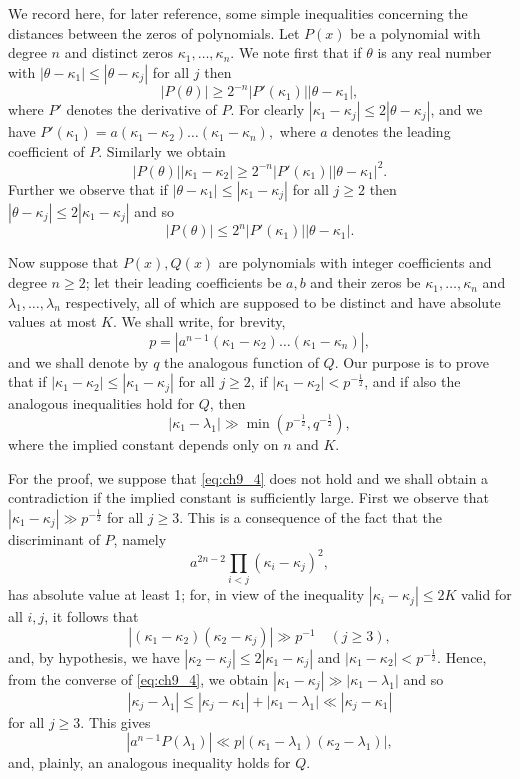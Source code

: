 We record here, for later reference, some simple inequalities concerning the distances between the zeros of polynomials. Let $P(x)$ be a polynomial with degree $n$ and distinct zeros $\kappa_1, \ldots, \kappa_n$. We note first that if $\theta$ is any real number with $|\theta - \kappa_1| \leq |\theta - \kappa_j|$ for all $j$ then
\[|P(\theta)| \geqslant 2^{-n} |P'(\kappa_1)| |\theta - \kappa_1|, \tag{1}\label{eq:ch9_1}\]
where $P'$ denotes the derivative of $P$. For clearly $|\kappa_1 - \kappa_j| \leq 2 |\theta - \kappa_j|$, and we have $P'(\kappa_1) = a(\kappa_1 - \kappa_2) \dots (\kappa_1 - \kappa_n),$ where $a$ denotes the leading coefficient of $P$. Similarly we obtain
\[|P(\theta)| |\kappa_1 - \kappa_2| \ge 2^{-n} |P'(\kappa_1)| |\theta - \kappa_1|^2. \tag{2}\label{eq:ch9_2}\]
Further we observe that if $|\theta - \kappa_1| \leq |\kappa_1 - \kappa_j|$ for all $j \geq 2$ then $|\theta - \kappa_j| \leq 2|\kappa_1 - \kappa_j|$ and so
\[|P(\theta)| \leq 2^n |P'(\kappa_1)| |\theta - \kappa_1|. \tag{3}\label{eq:ch9_3}\]

Now suppose that $P(x), Q(x)$ are polynomials with integer coefficients and degree $n \ge 2$; let their leading coefficients be $a, b$ and their zeros be $\kappa_1, \ldots, \kappa_n$ and $\lambda_1, \ldots, \lambda_n$ respectively, all of which are supposed to be distinct and have absolute values at most $K$. We shall write, for brevity,
\[p = |a^{n-1}(\kappa_1 - \kappa_2) \dots (\kappa_1 - \kappa_n)|,\]
and we shall denote by $q$ the analogous function of $Q$. Our purpose is to prove that if $|\kappa_1 - \kappa_2| \leq |\kappa_1 - \kappa_j|$ for all $j \geq 2$, if $|\kappa_1 - \kappa_2| < p^{-\frac{1}{2}}$, and if also the analogous inequalities hold for $Q$, then
\[|\kappa_1 - \lambda_1| \gg \min(p^{-\frac{1}{2}}, q^{-\frac{1}{2}}), \tag{4}\label{eq:ch9_4}\]
where the implied constant depends only on $n$ and $K$.

For the proof, we suppose that \eqref{eq:ch9_4} does not hold and we shall obtain a contradiction if the implied constant is sufficiently large. First we observe that $|\kappa_1 - \kappa_j| \gg p^{-\frac{1}{2}}$ for all $j \geqslant 3$. This is a consequence of the fact that the discriminant of $P$, namely
\[a^{2n-2}\prod_{i< j}(\kappa_i-\kappa_j)^2,\]
has absolute value at least 1; for, in view of the inequality $|\kappa_i - \kappa_j| \le 2K$ valid for all $i, j$, it follows that
\[\left|(\kappa_1-\kappa_2)(\kappa_2-\kappa_j)\right|\gg p^{-1}\quad (j\geqslant 3),\]
and, by hypothesis, we have $|\kappa_2 - \kappa_j| \leq 2 |\kappa_1 - \kappa_j|$ and $|\kappa_1 - \kappa_2| < p^{-\frac{1}{2}}$.
Hence, from the converse of \eqref{eq:ch9_4}, we obtain $|\kappa_1 - \kappa_j| \gg |\kappa_1 - \lambda_1|$ and so
\[|\kappa_j - \lambda_1| \leq |\kappa_j - \kappa_1| + |\kappa_1 - \lambda_1| \ll |\kappa_j - \kappa_1|\]
for all $j \ge 3$. This gives
\[\left|a^{n-1}P(\lambda_1)\right| \ll p\left|(\kappa_1 - \lambda_1)(\kappa_2 - \lambda_1)\right|, \tag{5}\label{eq:ch9_5}\]
and, plainly, an analogous inequality holds for $Q$.


